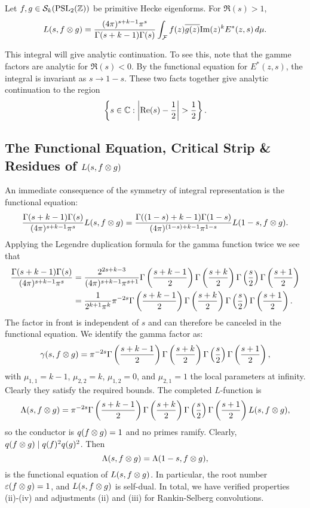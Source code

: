       \begin{theorem}
        Let $f,g \in \mathcal{S}_{k}(\mathrm{PSL}_{2}(\mathbb{Z}))$ be primitive Hecke eigenforms. For $\Re(s) > 1$,
        \[
          L(s,f \otimes g) = \frac{(4\pi)^{s+k-1}\pi^{s}}{\Gamma(s+k-1)\Gamma(s)}\int_{\mathcal{F}}f(z)\overline{g(z)}\mathrm{Im}(z)^{k}E^{\ast}(z,s)\,d\mu.
        \]
      \end{theorem}

      This integral will give analytic continuation. To see this, note that the gamme factors are analytic for $\Re(s) < 0$. By the functional equation for $E^{\ast}(z,s)$, the integral is invariant as $s \to 1-s$. These two facts together give analytic continuation to the region
      \[
        \left\{s \in \mathbb{C}:\left|\mathrm{Re}(s)-\frac{1}{2}\right| > \frac{1}{2}\right\}.
      \]
    \subsection*{The Functional Equation, Critical Strip \& Residues of \texorpdfstring{$L(s,f \otimes g)$}{L(s,f \ox g)}}
      An immediate consequence of the symmetry of integral representation is the functional equation:
      \[
        \frac{\Gamma(s+k-1)\Gamma(s)}{(4\pi)^{s+k-1}\pi^{s}}L(s,f \otimes g) = \frac{\Gamma((1-s)+k-1)\Gamma(1-s)}{(4\pi)^{(1-s)+k-1}\pi^{1-s}}L(1-s,f \otimes g).
      \]
      Applying the Legendre duplication formula for the gamma function twice we see that
      \begin{equation}\label{equ:duplication_for_Rankin-Selberg_gamma_factor}
        \begin{aligned}
          \frac{\Gamma(s+k-1)\Gamma(s)}{(4\pi)^{s+k-1}\pi^{s}} &= \frac{2^{2s+k-3}}{(4\pi)^{s+k-1}\pi^{s+1}}\Gamma\left(\frac{s+k-1}{2}\right)\Gamma\left(\frac{s+k}{2}\right)\Gamma\left(\frac{s}{2}\right)\Gamma\left(\frac{s+1}{2}\right) \\
          &= \frac{1}{2^{k+1}\pi^{k}}\pi^{-2s}\Gamma\left(\frac{s+k-1}{2}\right)\Gamma\left(\frac{s+k}{2}\right)\Gamma\left(\frac{s}{2}\right)\Gamma\left(\frac{s+1}{2}\right).
        \end{aligned}
      \end{equation}
      The factor in front is independent of $s$ and can therefore be canceled in the functional equation. We identify the gamma factor as:
      \[
        \gamma(s,f \otimes g) = \pi^{-2s}\Gamma\left(\frac{s+k-1}{2}\right)\Gamma\left(\frac{s+k}{2}\right)\Gamma\left(\frac{s}{2}\right)\Gamma\left(\frac{s+1}{2}\right),
      \]
      with $\mu_{1,1} = k-1$, $\mu_{2,2} = k$, $\mu_{1,2} = 0$, and $\mu_{2,1} = 1$ the local parameters at infinity. Clearly they satisfy the required bounds. The completed $L$-function is
      \[
        \Lambda(s,f \otimes g) = \pi^{-2s}\Gamma\left(\frac{s+k-1}{2}\right)\Gamma\left(\frac{s+k}{2}\right)\Gamma\left(\frac{s}{2}\right)\Gamma\left(\frac{s+1}{2}\right)L(s,f \otimes g),
      \]
      so the conductor is $q(f \otimes g) = 1$ and no primes ramify. Clearly, $q(f \otimes g) \mid q(f)^{2}q(g)^{2}$. Then
      \[
        \Lambda(s,f \otimes g) = \Lambda(1-s,f \otimes g),
      \]
      is the functional equation of $L(s,f \otimes g)$. In particular, the root number $\varepsilon(f \otimes g) = 1$, and $L(s,f \otimes g)$ is self-dual. In total, we have verified properties (ii)-(iv) and adjustments (ii) and (iii) for Rankin-Selberg convolutions.

